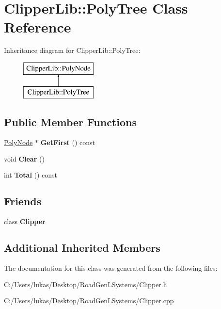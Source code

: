 \hypertarget{class_clipper_lib_1_1_poly_tree}{}\section{Clipper\+Lib\+:\+:Poly\+Tree Class Reference}
\label{class_clipper_lib_1_1_poly_tree}
Inheritance diagram for Clipper\+Lib\+:\+:Poly\+Tree\+:\begin{figure}[H]
\begin{center}
\leavevmode
\includegraphics[height=2.000000cm]{class_clipper_lib_1_1_poly_tree}
\end{center}
\end{figure}
\subsection*{Public Member Functions}
\begin{DoxyCompactItemize}
\item 
\hypertarget{class_clipper_lib_1_1_poly_tree_a8b88b8d6225281ee7d536902b0d04e9e}{}\label{class_clipper_lib_1_1_poly_tree_a8b88b8d6225281ee7d536902b0d04e9e} 
\hyperlink{class_clipper_lib_1_1_poly_node}{Poly\+Node} $\ast$ {\bfseries Get\+First} () const
\item 
\hypertarget{class_clipper_lib_1_1_poly_tree_a8620ea631d478b3c43274ac084902ec4}{}\label{class_clipper_lib_1_1_poly_tree_a8620ea631d478b3c43274ac084902ec4} 
void {\bfseries Clear} ()
\item 
\hypertarget{class_clipper_lib_1_1_poly_tree_ad0d3c974bab5a30cc8c916da9fe14388}{}\label{class_clipper_lib_1_1_poly_tree_ad0d3c974bab5a30cc8c916da9fe14388} 
int {\bfseries Total} () const
\end{DoxyCompactItemize}
\subsection*{Friends}
\begin{DoxyCompactItemize}
\item 
\hypertarget{class_clipper_lib_1_1_poly_tree_a4d39a09ecdddeeb85930dd4554a54b3c}{}\label{class_clipper_lib_1_1_poly_tree_a4d39a09ecdddeeb85930dd4554a54b3c} 
class {\bfseries Clipper}
\end{DoxyCompactItemize}
\subsection*{Additional Inherited Members}


The documentation for this class was generated from the following files\+:\begin{DoxyCompactItemize}
\item 
C\+:/\+Users/lukas/\+Desktop/\+Road\+Gen\+L\+Systems/Clipper.\+h\item 
C\+:/\+Users/lukas/\+Desktop/\+Road\+Gen\+L\+Systems/Clipper.\+cpp\end{DoxyCompactItemize}
